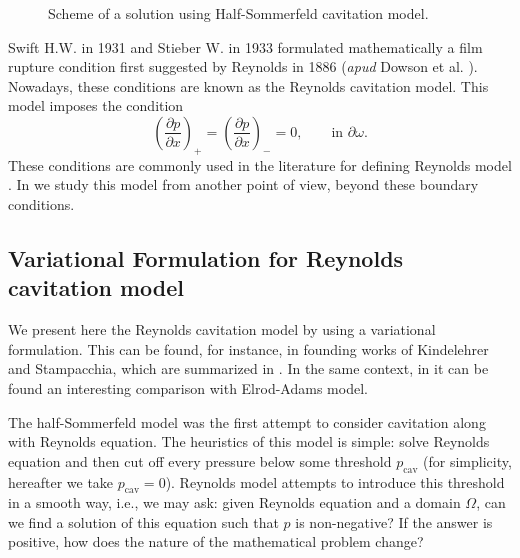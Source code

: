  \begin{figure}[ht!]
 \centering 
 \def\svgwidth{0.6\textwidth}	
 \small{
}
\caption{Scheme of a solution using Half-Sommerfeld cavitation model.}\label{fig:mass_cons_half_sommerfeld}
\end{figure}

Swift H.W. in 1931 and Stieber W. in 1933 formulated mathematically a film rupture condition first suggested by Reynolds in 1886 (\emph{apud} Dowson et al. \cite{dowson1979}). Nowadays, these conditions are known as the Reynolds cavitation model. This model imposes the condition
\begin{equation}
\left(\frac{\partial p}{\partial x}\right)_+=\left(\frac{\partial p}{\partial x}\right)_-=0,\qquad \text{in }\partial \omega.\label{eq:reynolds_cond_1d}
\end{equation}
These conditions are commonly used in the literature for defining Reynolds model \cite{cameron1971,dowson1979,braun2010}. In  we study this model from another point of view, beyond these boundary conditions.
\subsection{Variational Formulation for Reynolds cavitation model}
\label{sec:weak_form_reynolds_model}
We present here the Reynolds cavitation model by using a variational formulation. This can be found, for instance, in founding works of Kindelehrer and Stampacchia, which are summarized in \cite{kinderlehrer1980}. In the same context, in \cite{chambat1986} it can be found an interesting comparison with Elrod-Adams model.

The half-Sommerfeld model was the first attempt to consider cavitation along with Reynolds equation. The heuristics of this model is simple: solve Reynolds equation and then cut off every pressure below some threshold $p_\text{cav}$ (for simplicity, hereafter we take $p_\text{cav}=0$). Reynolds model attempts to introduce this threshold in a smooth way, i.e., we may ask: given Reynolds equation and a domain $\Omega$, can we find a solution of this equation such that $p$ is non-negative? If the answer is positive, how does the nature of the mathematical problem change?

